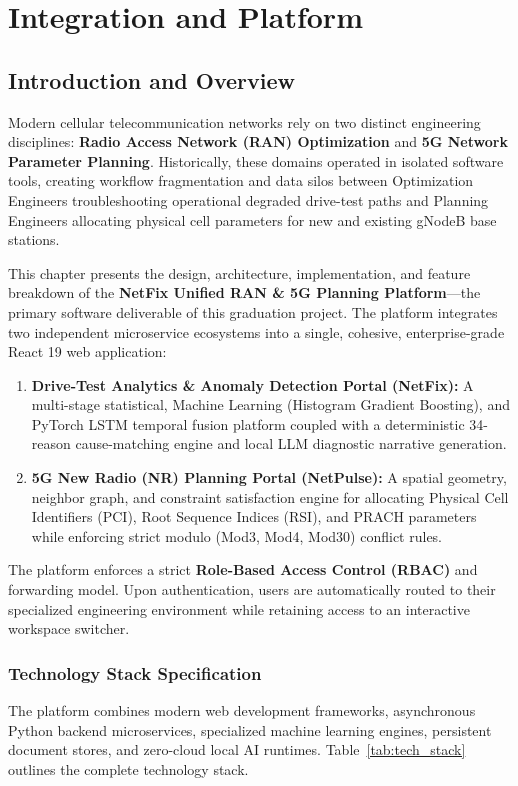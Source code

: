 \documentclass[12pt,a4paper]{report}
\begin{document}
\setcounter{chapter}{3} %
\chapter{Integration and Platform}
\label{chap:integration_and_platform}

\section{Introduction and Overview}
Modern cellular telecommunication networks rely on two distinct engineering disciplines: \textbf{Radio Access Network (RAN) Optimization} and \textbf{5G Network Parameter Planning}. Historically, these domains operated in isolated software tools, creating workflow fragmentation and data silos between Optimization Engineers troubleshooting operational degraded drive-test paths and Planning Engineers allocating physical cell parameters for new and existing gNodeB base stations.

This chapter presents the design, architecture, implementation, and feature breakdown of the \textbf{NetFix Unified RAN \& 5G Planning Platform}—the primary software deliverable of this graduation project. The platform integrates two independent microservice ecosystems into a single, cohesive, enterprise-grade React 19 web application:
\begin{enumerate}
    \item \textbf{Drive-Test Analytics \& Anomaly Detection Portal (NetFix):} A multi-stage statistical, Machine Learning (Histogram Gradient Boosting), and PyTorch LSTM temporal fusion platform coupled with a deterministic 34-reason cause-matching engine and local LLM diagnostic narrative generation.
    \item \textbf{5G New Radio (NR) Planning Portal (NetPulse):} A spatial geometry, neighbor graph, and constraint satisfaction engine for allocating Physical Cell Identifiers (PCI), Root Sequence Indices (RSI), and PRACH parameters while enforcing strict modulo (Mod3, Mod4, Mod30) conflict rules.
\end{enumerate}

The platform enforces a strict \textbf{Role-Based Access Control (RBAC)} and forwarding model. Upon authentication, users are automatically routed to their specialized engineering environment while retaining access to an interactive workspace switcher.

\subsection{Technology Stack Specification}
The platform combines modern web development frameworks, asynchronous Python backend microservices, specialized machine learning engines, persistent document stores, and zero-cloud local AI runtimes. Table~\ref{tab:tech_stack} outlines the complete technology stack.
\end{document}

